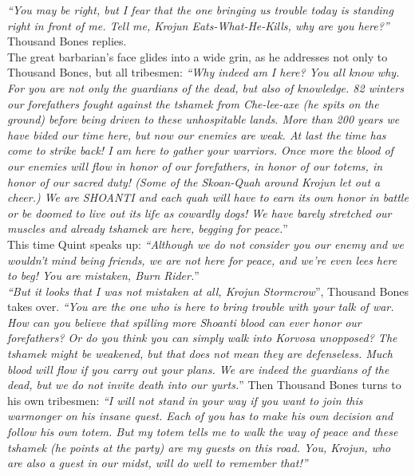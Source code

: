 {\itshape``You may be right, but I fear that the one bringing us trouble today is standing right in front of me. Tell me, Krojun Eats-What-He-Kills, why are you here?''} Thousand Bones replies.\\

The great barbarian's face glides into a wide grin, as he addresses not only to Thousand Bones, but all tribesmen: {\itshape``Why indeed am I here? You all know why. For you are not only the guardians of the dead, but also of knowledge. 82 winters our forefathers fought against the tshamek from Che-lee-axe (he spits on the ground) before being driven to these unhospitable lands. More than 200 years we have bided our time here, but now our enemies are weak. At last the time has come to strike back! I am here to gather your warriors. Once more the blood of our enemies will flow in honor of our forefathers, in honor of our totems, in honor of our sacred duty! (Some of the Skoan-Quah around Krojun let out a cheer.) We are SHOANTI and each quah will have to earn its own honor in battle or be doomed to live out its life as cowardly dogs! We have barely stretched our muscles and already tshamek are here, begging for peace.}''\\

This time Quint speaks up: {\itshape``Although we do not consider you our enemy and we wouldn't mind being friends, we are not here for peace, and we're even lees here to beg! You are mistaken, Burn Rider.}''\\

{\itshape``But it looks that I was not mistaken at all, Krojun Stormcrow}'', Thousand Bones takes over. {\itshape``You are the one who is here to bring trouble with your talk of war. How can you believe that spilling more Shoanti blood can ever honor our forefathers? Or do you think you can simply walk into Korvosa unopposed? The tshamek might be weakened, but that does not mean they are defenseless. Much blood will flow if you carry out your plans. We are indeed the guardians of the dead, but we do not invite death into our yurts.}'' Then Thousand Bones turns to his own tribesmen: {\itshape``I will not stand in your way if you want to join this warmonger on his insane quest. Each of you has to make his own decision and follow his own totem. But my totem tells me to walk the way of peace and these tshamek (he points at the party) are my guests on this road. You, Krojun, who are also a guest in our midst, will do well to remember that!''}\\

